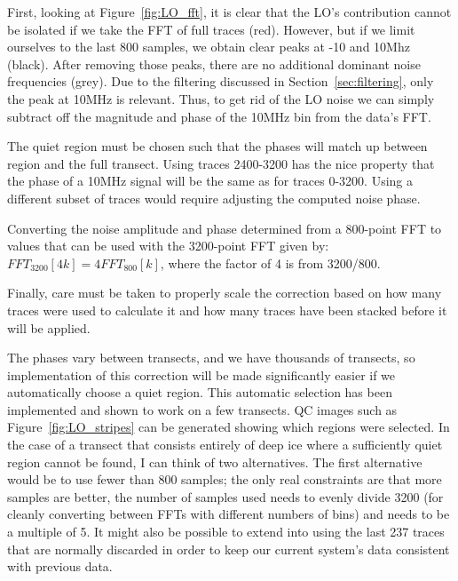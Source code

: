 \documentclass[11pt]{article}
\newcommand{\secref}[1]{Section~\ref{#1}}
\newcommand{\figref}[1]{Figure~\ref{#1}}
\begin{document}
First, looking at \figref{fig:LO_fft}, it is clear that the LO's contribution cannot be isolated if we take the FFT of full traces (red). However, but if we limit ourselves to the last 800 samples, we obtain clear peaks at -10 and 10Mhz (black). After removing those peaks, there are no additional dominant noise frequencies (grey). Due to the filtering discussed in \secref{sec:filtering}, only the peak at 10MHz is relevant. Thus, to get rid of the LO noise we can simply subtract off the magnitude and phase of the 10MHz bin from the data's FFT. 

The quiet region must be chosen such that the phases will match up between region and the full transect. Using traces 2400-3200 has the nice property that the phase of a 10MHz signal will be the same as for traces 0-3200. Using a different subset of traces would require adjusting the computed noise phase.

Converting the noise amplitude and phase determined from a 800-point FFT to values that can be used with the 3200-point FFT given by: $FFT_{3200}[4k]=4FFT_{800}[k]$, where the factor of 4 is from 3200/800.

Finally, care must be taken to properly scale the correction based on how many traces were used to calculate it and how many traces have been stacked before it will be applied.

The phases vary between transects, and we have thousands of transects, so implementation of this correction will be made significantly easier if we automatically choose a quiet region. This automatic selection has been implemented and shown to work on a few transects. QC images such as \figref{fig:LO_stripes} can be generated showing which regions were selected. In the case of a transect that consists entirely of deep ice where a sufficiently quiet region cannot be found, I can think of two alternatives. The first alternative would be to use fewer than 800 samples; the only real constraints are that more samples are better, the number of samples used needs to evenly divide 3200 (for cleanly converting between FFTs with different numbers of bins) and needs to be a multiple of 5. It might also be possible to extend into using the last 237 traces that are normally discarded in order to keep our current system's data consistent with previous data.

\end{document}

